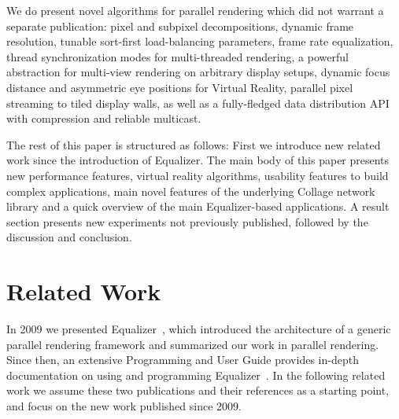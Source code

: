\documentclass[10pt,journal,compsoc]{IEEEtran}
\begin{document}
We do present novel algorithms for parallel rendering which did not warrant a
separate publication: pixel and subpixel decompositions, dynamic frame
resolution, tunable sort-first load-balancing parameters, frame rate
equalization, thread synchronization modes for multi-threaded rendering, a
powerful abstraction for multi-view rendering on arbitrary display setups,
dynamic focus distance and asymmetric eye positions for Virtual Reality,
parallel pixel streaming to tiled display walls, as well as a fully-fledged data
distribution API with compression and reliable multicast.

The rest of this paper is structured as follows: First we introduce new related
work since the introduction of \textsf{Equalizer}. The main body of this paper
presents new performance features, virtual reality algorithms, usability
features to build complex applications, main novel features of the underlying
\textsf{Collage} network library and a quick overview of the main
\textsf{Equalizer}-based applications. A result section presents new experiments
not previously published, followed by the discussion and conclusion.

\section{Related Work}\label{sec:related}

In 2009 we presented \textsf{Equalizer}~\cite{EMP:09}, which introduced the
architecture of a generic parallel rendering framework and summarized our work
in parallel rendering. Since then, an extensive Programming and User Guide
provides in-depth documentation on using and programming
\textsf{Equalizer}~\cite{Eilemann:13}. In the following related work we assume
these two publications and their references as a starting point, and focus on
the new work published since 2009.
\end{document}
